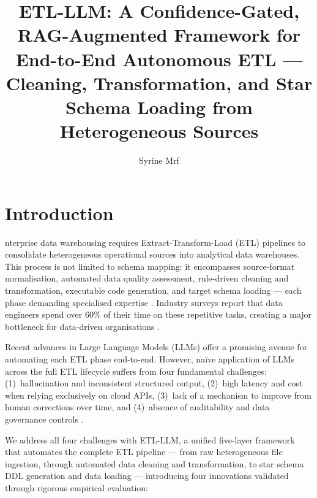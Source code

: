 \documentclass[9pt,a4paper,twocolumn,twoside]{rho-class/rho}
\title{ETL-LLM: A Confidence-Gated, RAG-Augmented Framework for\\
End-to-End Autonomous ETL --- Cleaning, Transformation, and Star Schema Loading from Heterogeneous Sources}
\author[{\textasteriskcentered},a,1]{Syrine Mrf}
\affil[a]{Department of Computer Science, Research Laboratory in Business Intelligence and Data Engineering}
\begin{document}
    \maketitle
    \thispagestyle{firststyle}


\section{Introduction}

    nterprise data warehousing requires Extract-Transform-Load (ETL) pipelines to consolidate heterogeneous operational sources into analytical data warehouses. This process is not limited to schema mapping: it encompasses source-format normalisation, automated data quality assessment, rule-driven cleaning and transformation, executable code generation, and target schema loading --- each phase demanding specialised expertise \cite{vassiliadis2002conceptual, el-sappagh2011etl}. Industry surveys report that data engineers spend over 60\% of their time on these repetitive tasks, creating a major bottleneck for data-driven organisations \cite{stonebraker2018data}.

    Recent advances in Large Language Models (LLMs) offer a promising avenue for automating each ETL phase end-to-end. However, na\"ive application of LLMs across the full ETL lifecycle suffers from four fundamental challenges: (1)~hallucination and inconsistent structured output, (2)~high latency and cost when relying exclusively on cloud APIs, (3)~lack of a mechanism to improve from human corrections over time, and (4)~absence of auditability and data governance controls \cite{narayan2022foundation}.

    We address all four challenges with \textsc{ETL-LLM}, a unified five-layer framework that automates the complete ETL pipeline --- from raw heterogeneous file ingestion, through automated data cleaning and transformation, to star schema DDL generation and data loading --- introducing four innovations validated through rigorous empirical evaluation:
\end{document}
